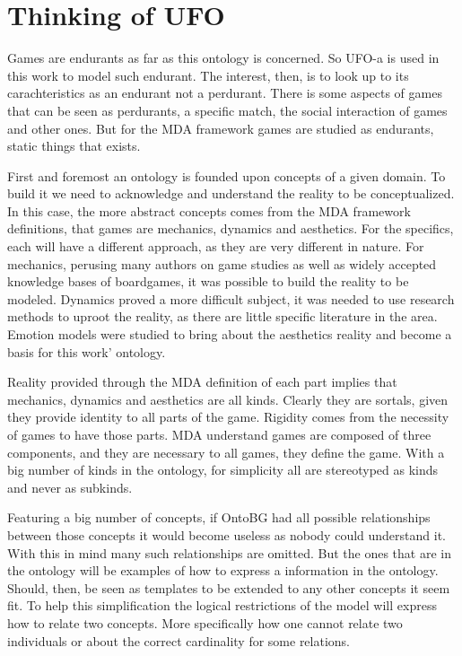 \section{Thinking of UFO} 


Games are endurants as far as this ontology is concerned. So UFO-a is used in this work to model such endurant. The interest, then, is to look up to its carachteristics as an endurant not a perdurant. There is some aspects of games that can be seen as perdurants, a specific match, the social interaction of games and other ones. But for the MDA framework games are studied as endurants, static things that exists.

First and foremost an ontology is founded upon concepts of a given domain. To build it we need to acknowledge and understand the reality to be conceptualized. In this case, the more abstract concepts comes from the MDA framework definitions, that games are mechanics, dynamics and aesthetics. For the specifics, each will have a different approach, as they are very different in nature. For mechanics, perusing many authors on game studies as well as widely accepted knowledge bases of boardgames, it was possible to build the reality to be modeled. Dynamics proved a more difficult subject, it was needed to use research methods to uproot the reality, as there are little specific literature in the area. Emotion models were studied to bring about the aesthetics reality and become a basis for this work' ontology.

Reality provided through the MDA definition of each part implies that mechanics, dynamics and aesthetics are all kinds. Clearly they are sortals, given they provide identity to all parts of the game. Rigidity comes from the necessity of games to have those parts. MDA understand games are composed of three components, and they are necessary to all games, they define the game. With a big number of kinds in the ontology, for simplicity all are stereotyped as kinds and never as subkinds.

Featuring a big number of concepts, if OntoBG had all possible relationships between those concepts it would become useless as nobody could understand it. With this in mind many such relationships are omitted. But the ones that are in the ontology will be examples of how to express a information in the ontology. Should, then, be seen as templates to be extended to any other concepts it seem fit. To help this simplification the logical restrictions of the model will express how to relate two concepts. More specifically how one cannot relate two individuals or about the correct cardinality for some relations. 

